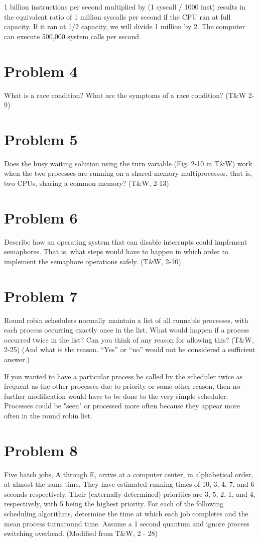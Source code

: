 \documentclass[11pt]{article}
\begin{document}
1 billion instructions per second multiplied by (1 syscall / 1000 inst) results in the equivalent ratio of 1 million syscalls per second if the CPU ran at full capacity. If it ran at 1/2 capacity, we will divide 1 million by 2. The computer can execute 500,000 system calls per second. 


\section*{Problem 4}
What is a race condition? What are the symptoms of a race condition? (T\&W 2-9)


\section*{Problem 5}
Does the busy waiting solution using the turn variable (Fig. 2-10 in T\&W) work when the two processes are running on a shared-memory multiprocessor, that is, two CPUs, sharing a common memory? (T\&W, 2-13)


\section*{Problem 6}
Describe how an operating system that can disable interrupts could implement semaphores. That is, what steps would have to happen in which order to implement the semaphore operations safely. (T\&W, 2-10)


\section*{Problem 7}
Round robin schedulers normally maintain a list of all runnable processes, with each process occurring exactly once in the list. What would happen if a process occurred twice in the list? Can you think of any reason for allowing this? (T\&W, 2-25) (And what is the reason. “Yes” or “no” would not be considered a sufficient answer.)

If you wanted to have a particular process be called by the scheduler twice as frequent as the other processes due to priority or some other reason, then no further modification would have to be done to the very simple scheduler. Processes could be "seen" or processed more often because they appear more often in the round robin list.

\section*{Problem 8}
Five batch jobs, A through E, arrive at a computer center, in alphabetical order, at almost the same time. They have estimated running times of 10, 3, 4, 7, and 6 seconds respectively. Their (externally determined) priorities are 3, 5, 2, 1, and 4, respectively, with 5 being the highest priority. For each of the following scheduling algorithms, determine the time at which each job completes and the mean process turnaround time. Assume a 1 second quantum and ignore process switching overhead. (Modified from T\&W, 2 - 28)
\end{document}

